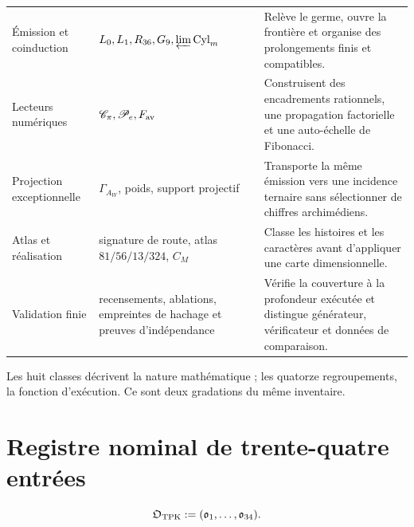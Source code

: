 \begin{longtable}{@{}p{}p{}p{}@{}}
Émission et coinduction&
\(L_0,L_1,R_{36},G_9,\varprojlim\operatorname{Cyl}_m\)&
Relève le germe, ouvre la frontière et organise des prolongements finis et
compatibles.\\

Lecteurs numériques&
\(\mathscr C_\pi,\mathscr P_e,F_{\rm av}\)&
Construisent des encadrements rationnels, une propagation factorielle et une auto-échelle de
Fibonacci.\\

Projection exceptionnelle&
\(\Gamma_{A_W}\), poids, support projectif&
Transporte la même émission vers une incidence ternaire sans sélectionner de chiffres
archimédiens.\\

Atlas et réalisation&
signature de route, atlas \(81/56/13/324\), \(C_M\)&
Classe les histoires et les caractères avant d’appliquer une carte dimensionnelle.\\

Validation finie&
recensements, ablations, empreintes de hachage et preuves d'indépendance&
Vérifie la couverture à la profondeur exécutée et distingue générateur, vérificateur et données de comparaison.\\
\bottomrule
\end{longtable}
\endgroup

Les huit classes décrivent la nature mathématique ; les quatorze regroupements,
la fonction d’exécution. Ce sont deux gradations du même inventaire.

\section{Registre nominal de trente-quatre entrées}

\begin{equation}
 \mathfrak O_{\rm TPK}:=(\mathfrak o_1,\ldots,\mathfrak o_{34}).
 \label{eq:u006f-registro-operadores}
\end{equation}


